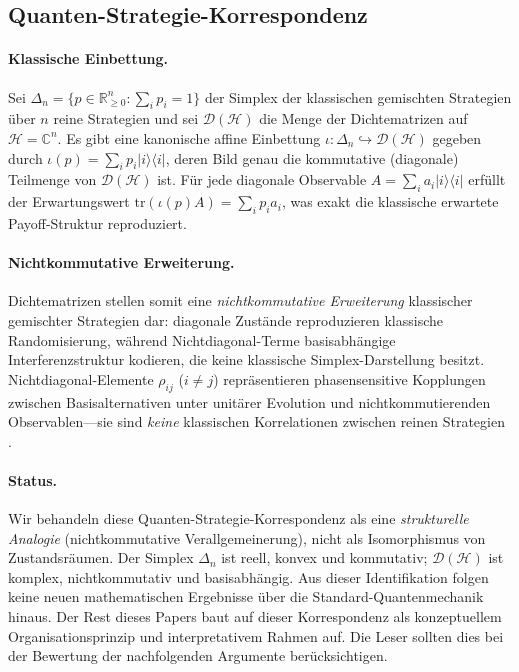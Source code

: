 \documentclass[12pt,a4paper]{article}
\theoremstyle{remark}
\begin{document}
\subsection{Quanten-Strategie-Korrespondenz}

\paragraph{Klassische Einbettung.}
Sei $\Delta_n = \{p \in \mathbb{R}_{\geq 0}^n : \sum_i p_i = 1\}$ der Simplex der klassischen gemischten Strategien \"uber $n$ reine Strategien und sei $\mathcal{D}(\mathcal{H})$ die Menge der Dichtematrizen auf $\mathcal{H} = \mathbb{C}^n$. Es gibt eine kanonische affine Einbettung $\iota: \Delta_n \hookrightarrow \mathcal{D}(\mathcal{H})$ gegeben durch $\iota(p) = \sum_i p_i |i\rangle\langle i|$, deren Bild genau die kommutative (diagonale) Teilmenge von $\mathcal{D}(\mathcal{H})$ ist. F\"ur jede diagonale Observable $A = \sum_i a_i |i\rangle\langle i|$ erf\"ullt der Erwartungswert $\mathrm{tr}(\iota(p) A) = \sum_i p_i a_i$, was exakt die klassische erwartete Payoff-Struktur reproduziert.

\paragraph{Nichtkommutative Erweiterung.}
Dichtematrizen stellen somit eine \emph{nichtkommutative Erweiterung} klassischer gemischter Strategien dar: diagonale Zust\"ande reproduzieren klassische Randomisierung, w\"ahrend Nichtdiagonal-Terme basisabh\"angige Interferenzstruktur kodieren, die keine klassische Simplex-Darstellung besitzt. Nichtdiagonal-Elemente $\rho_{ij}$ ($i \neq j$) repr\"asentieren phasensensitive Kopplungen zwischen Basisalternativen unter unit\"arer Evolution und nichtkommutierenden Observablen---sie sind \emph{keine} klassischen Korrelationen zwischen reinen Strategien \citep{Lindblad2015}.

\paragraph{Status.}
Wir behandeln diese Quanten-Strategie-Korrespondenz als eine \emph{strukturelle Analogie} (nichtkommutative Verallgemeinerung), nicht als Isomorphismus von Zustandsr\"aumen. Der Simplex $\Delta_n$ ist reell, konvex und kommutativ; $\mathcal{D}(\mathcal{H})$ ist komplex, nichtkommutativ und basisabh\"angig. Aus dieser Identifikation folgen keine neuen mathematischen Ergebnisse \"uber die Standard-Quantenmechanik hinaus. Der Rest dieses Papers baut auf dieser Korrespondenz als konzeptuellem Organisationsprinzip und interpretativem Rahmen auf. Die Leser sollten dies bei der Bewertung der nachfolgenden Argumente ber\"ucksichtigen.
\end{document}
